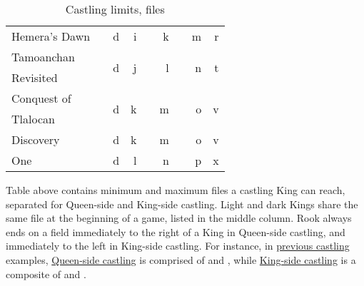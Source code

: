 \begin{table}[!h]
\begin{tabular}{ lcrrcrcrr }
Hemera's Dawn         & & d                     & i                     & & k                   & & m                   & r                     \\
\cmidrule{1-9} %
Tamoanchan            & & \multirow{2}{*}{d}    & \multirow{2}{*}{j}    & & \multirow{2}{*}{l}  & & \multirow{2}{*}{n}  & \multirow{2}{*}{t}    \\
Revisited             & &                       &                       & &                     & &                     &                       \\
\cmidrule{1-9} %
Conquest of           & & \multirow{2}{*}{d}    & \multirow{2}{*}{k}    & & \multirow{2}{*}{m}  & & \multirow{2}{*}{o}  & \multirow{2}{*}{v}    \\
Tlalocan              & &                       &                       & &                     & &                     &                       \\
\cmidrule{1-9} %
Discovery             & & d                     & k                     & & m                   & & o                   & v                     \\
One                   & & d                     & l                     & & n                   & & p                   & x                     \\
\bottomrule %
\end{tabular}
\caption{Castling limits, files}
\label{tbl:Appendix/Summary/Castling limits}
\end{table}

Table above contains minimum and maximum files a castling King can reach, separated
for Queen-side and King-side castling. Light and dark Kings share the same file at
the beginning of a game, listed in the middle column.\newline
\indent
Rook always ends on a field immediately to the right of a King in Queen-side castling,
and immediately to the left in King-side castling.\newline
\indent
For instance, in
\hyperref[sec:Appendix/Notation/Castling]{previous castling} examples,
\hyperref[fig:age_of_aquarius_castling_left_04]{Queen-side castling}
 is comprised of  and , while
\hyperref[fig:one_castling_right_04]{King-side castling}  is a
composite of  and .


